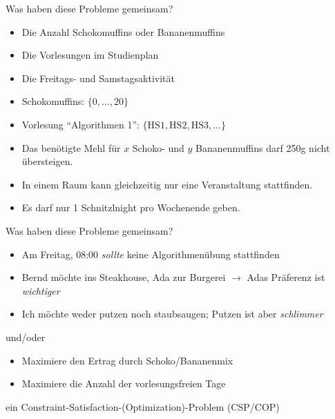 \begin{frame}{Was haben diese Probleme gemeinsam?}
 
\begin{itemize}
\item Die Anzahl Schokomuffins oder Bananenmuffins
\item Die Vorlesungen im Studienplan
\item Die Freitags- und Samstagsaktivität
\end{itemize}
\pause

\vspace*{2ex}

 
\begin{itemize}
\item Schokomuffins: $\{0, \ldots, 20\}$
\item Vorlesung ``Algorithmen 1'': $\{\mathrm{HS1}, \mathrm{HS2}, \mathrm{HS3}, \ldots \}$
\end{itemize}

\pause

\vspace*{2ex}

 
\begin{itemize}
\item Das benötigte Mehl für $x$ Schoko- und $y$ Bananenmuffins darf 250g nicht übersteigen.
\item In einem Raum kann gleichzeitig nur eine Veranstaltung stattfinden.
\item Es darf nur 1 Schnitzlnight pro Wochenende geben.
\end{itemize} \pause 
\end{frame}

\begin{frame}{Was haben diese Probleme gemeinsam?}
 
\begin{itemize}
\item Am Freitag, 08:00 \emph{sollte} keine Algorithmenübung stattfinden
\item Bernd möchte ins Steakhouse, Ada zur Burgerei $\rightarrow$ Adas Präferenz ist \emph{wichtiger}
\item Ich möchte weder putzen noch staubsaugen; Putzen ist aber \emph{schlimmer}
\end{itemize}
\pause

\vspace*{2ex}
und/oder
\vspace*{2ex}

 
\begin{itemize}
\item Maximiere den Ertrag durch Schoko/Bananenmix
\item Maximiere die Anzahl der vorlesungsfreien Tage
\end{itemize}

\vspace*{2ex}
\hfill ein \alert{Constraint-Satisfaction-(Optimization)-Problem} (CSP/COP)
\end{frame}

